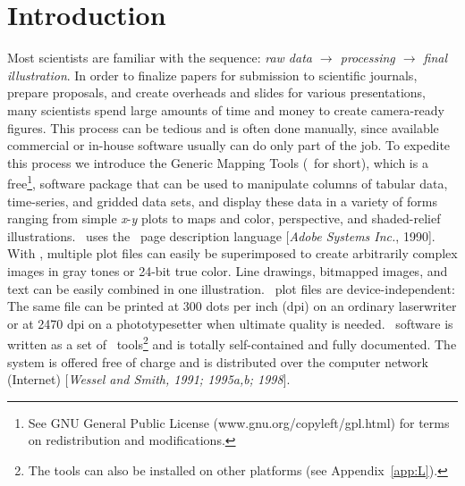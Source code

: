 %
%
\chapter{Introduction}
\label{ch:2}
\thispagestyle{headings}

Most scientists are familiar with the sequence:
\emph{raw data $\rightarrow$ processing $\rightarrow$ final illustration}.
In order to finalize papers for submission to scientific journals,
prepare proposals, and create overheads and slides for various
presentations, many scientists spend large amounts of time and
money to create camera-ready figures.  This process can be tedious
and is often done manually, since available commercial or in-house
software usually can do only part of the job.  To expedite this
process we introduce the Generic Mapping Tools (\GMT\ for short),
which is a free\footnote{See GNU General Public License
(www.gnu.org/copyleft/gpl.html) for terms on
redistribution and modifications.}, software package that can be used
to manipulate columns of tabular data, time-series, and gridded
data sets, and display these data in a variety of forms ranging
from simple \emph{x}-\emph{y} plots to maps and color, perspective,
and shaded-relief illustrations.  \GMT\ uses the \PS\
page description language [\emph{Adobe Systems Inc.}, 1990].  With \PS, multiple plot
files can easily be superimposed to create arbitrarily complex
images in gray tones or 24-bit true color.  Line drawings, bitmapped
images, and text can be easily combined in one illustration.
\PS\ plot files are device-independent: The same file
can be printed at 300 dots per inch (dpi) on an ordinary laserwriter
or at 2470 dpi on a phototypesetter when ultimate quality is needed.
\GMT\ software is written as a set of \UNIX\ tools\footnote{The
tools can also be installed on other platforms (see Appendix~\ref{app:L}).}
and is totally self-contained and fully documented.  The system is offered free
of charge and is distributed over the computer
network (Internet) [\emph{Wessel and Smith, 1991; 1995a,b; 1998}].

